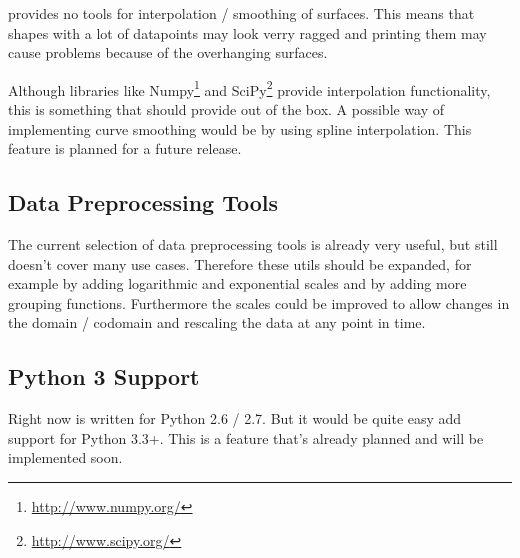 \tangible{} provides no tools for interpolation / smoothing of surfaces. This
means that shapes with a lot of datapoints may look verry ragged and printing
them may cause problems because of the overhanging surfaces.

Although libraries like Numpy\footnote{\url{http://www.numpy.org/}} and
SciPy\footnote{\url{http://www.scipy.org/}} provide interpolation functionality,
this is something that \tangible{} should provide out of the box. A possible way
of implementing curve smoothing would be by using spline interpolation. This
feature is planned for a future release.

\subsection{Data Preprocessing Tools}

The current selection of data preprocessing tools is already very useful, but
still doesn't cover many use cases. Therefore these utils should be expanded,
for example by adding logarithmic and exponential scales and by adding more
grouping functions. Furthermore the scales could be improved to allow changes in
the domain / codomain and rescaling the data at any point in time.

\subsection{Python 3 Support}

Right now \tangible{} is written for Python 2.6 / 2.7. But it would be quite
easy add support for Python 3.3+. This is a feature that's already planned and
will be implemented soon.


